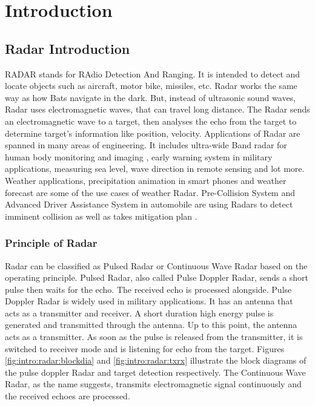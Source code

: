 \chapter{Introduction}
\label{chap:introduction}

\section{Radar Introduction}
\label{sec:intro:radarintroduction}
RADAR stands for RAdio Detection And Ranging. It is intended to detect and locate objects such as aircraft, motor bike, missiles, etc. Radar works the same way as how Bats navigate in the dark. But, instead of ultrasonic sound waves, Radar uses electromagnetic waves, that can travel long distance. The Radar sends an electromagnetic wave to a target, then analyses the echo from the target to determine target's information like position, velocity. Applications of Radar are spanned in many areas of engineering. It includes ultra-wide Band radar for human body monitoring and imaging \cite{radarMedi}, early warning system in military applications, measuring sea level, wave direction in remote sensing and lot more. Weather applications, precipitation animation in smart phones and weather forecast are some of the use cases of weather Radar. Pre-Collision System and Advanced Driver Assistance System in automobile are using Radars to detect imminent collision as well as takes mitigation plan \cite{radarCollAvoid}.

\subsection{Principle of Radar}
\label{sec:intro:principleofradar}
Radar can be classified as Pulsed Radar or Continuous Wave Radar based on the operating principle. Pulsed Radar, also called Pulse Doppler Radar, sends a short pulse then waits for the echo. The received echo is processed alongside. Pulse Doppler Radar is widely used in military applications. It has an antenna that acts as a transmitter and receiver. A short duration high energy pulse is generated and transmitted through the antenna. Up to this point, the antenna acts as a transmitter. As soon as the pulse is released from the transmitter, it is switched to receiver mode and is listening for echo from the target. Figures \ref{fig:intro:radar:blockdia} and \ref{fig:intro:radar:txrx} illustrate the block diagrams of the pulse doppler Radar and target detection respectively. The Continuous Wave Radar, as the name suggests, transmits electromagnetic signal continuously and the received echoes are processed.

